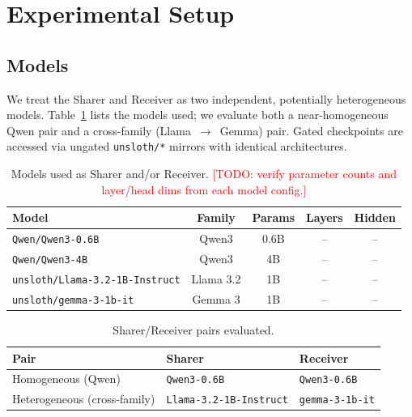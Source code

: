 \documentclass[11pt]{article}
\newcommand{\sharer}{\textsf{Sharer}\xspace}
\newcommand{\receiver}{\textsf{Receiver}\xspace}
\newcommand{\TODO}[1]{\textcolor{red}{[TODO: #1]}}
\newcommand{\res}{--}                             %
\begin{document}
\section{Experimental Setup}\label{sec:experiments}
\subsection{Models}
We treat the \sharer and \receiver as two independent, potentially
heterogeneous models. Table~\ref{tab:models} lists the models used; we evaluate
both a near-homogeneous Qwen pair and a cross-family (Llama~$\rightarrow$~Gemma)
pair. Gated checkpoints are accessed via ungated \texttt{unsloth/*} mirrors with
identical architectures.

\begin{table}[h]
  \centering
  \caption{Models used as \sharer and/or \receiver. \TODO{verify parameter
  counts and layer/head dims from each model config.}}
  \label{tab:models}
  \begin{tabular}{lcccc}
    \toprule
    Model & Family & Params & Layers & Hidden \\
    \midrule
    \texttt{Qwen/Qwen3-0.6B}            & Qwen3   & 0.6B & \res & \res \\
    \texttt{Qwen/Qwen3-4B}              & Qwen3   & 4B   & \res & \res \\
    \texttt{unsloth/Llama-3.2-1B-Instruct} & Llama 3.2 & 1B & \res & \res \\
    \texttt{unsloth/gemma-3-1b-it}      & Gemma 3 & 1B   & \res & \res \\
    \bottomrule
  \end{tabular}
\end{table}

\begin{table}[h]
  \centering
  \caption{\sharer/\receiver pairs evaluated.}
  \label{tab:pairs}
  \begin{tabular}{lll}
    \toprule
    Pair & \sharer & \receiver \\
    \midrule
    Homogeneous (Qwen)   & \texttt{Qwen3-0.6B} & \texttt{Qwen3-0.6B} \\
    Heterogeneous (cross-family) & \texttt{Llama-3.2-1B-Instruct} & \texttt{gemma-3-1b-it} \\
    \bottomrule
  \end{tabular}
\end{table}
\end{document}
